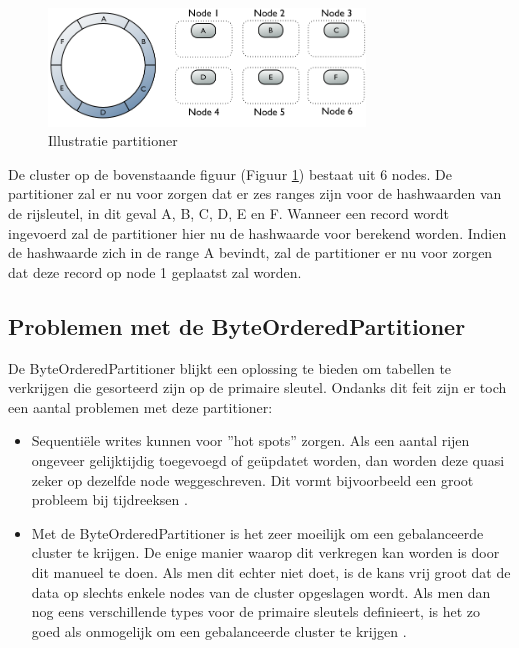 \begin{figure}[H]
	\centering
	\includegraphics[width=0.75\textwidth]{img/4_architectuur/partitioner}
	\caption{Illustratie partitioner \citep{DataStax2016Partitioner}}
	\label{fig:partitioner}
\end{figure}

De cluster op de bovenstaande figuur (Figuur \ref{fig:partitioner}) bestaat uit 6 nodes.
De partitioner zal er nu voor zorgen dat er zes ranges zijn voor de hashwaarden van de rijsleutel, in dit geval A, B, C, D, E en F.
Wanneer een record wordt ingevoerd zal de partitioner hier nu de hashwaarde voor berekend worden.
Indien de hashwaarde zich in de range A bevindt, zal de partitioner er nu voor zorgen dat deze record op node 1 geplaatst zal worden.

\subsection{Problemen met de ByteOrderedPartitioner}
De ByteOrderedPartitioner blijkt een oplossing te bieden om tabellen te verkrijgen die gesorteerd zijn op de primaire sleutel.
Ondanks dit feit zijn er toch een aantal problemen met deze partitioner:

\begin{itemize}
	\item Sequentiële writes kunnen voor ''hot spots'' zorgen.
	Als een aantal rijen ongeveer gelijktijdig toegevoegd of geüpdatet worden, dan worden deze quasi zeker op dezelfde node weggeschreven.
	Dit vormt bijvoorbeeld een groot probleem bij tijdreeksen \citep{kan2014cassandra}.
	
	\item Met de ByteOrderedPartitioner is het zeer moeilijk om een gebalanceerde cluster te krijgen.
	De enige manier waarop dit verkregen kan worden is door dit manueel te doen.
	Als men dit echter niet doet, is de kans vrij groot dat de data op slechts enkele nodes van de cluster opgeslagen wordt.
	Als men dan nog eens verschillende types voor de primaire sleutels definieert, is het zo goed als onmogelijk om een gebalanceerde cluster te krijgen
	\citep{Bauer2013CaseAgainstByteOrder}.
\end{itemize}

